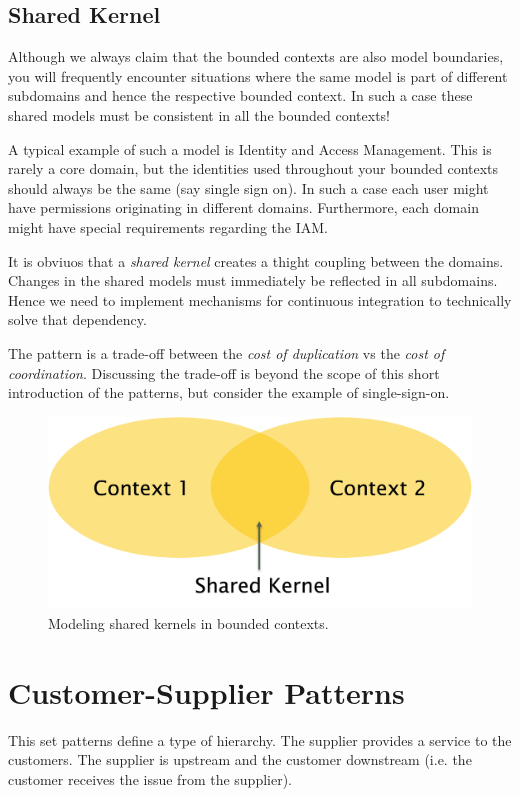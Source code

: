 \documentclass{tufte-handout}
\begin{document}
\subsection{Shared Kernel}

Although we always claim that the bounded contexts are also model boundaries, you will 
frequently encounter situations where the same model is part of different subdomains and
hence the respective bounded context. In such a case these shared models must be consistent
in all the  bounded contexts!

A typical example of such a model is Identity and Access Management. This is rarely a core
domain, but the identities used throughout your bounded contexts should always be the same 
(say single sign on). In such a case each user might have permissions originating in different
domains. Furthermore, each domain might have special requirements regarding the IAM.

It is obviuos that a \textit{shared kernel} creates a thight coupling between the domains.
Changes in the shared models must immediately be reflected in all subdomains. Hence we 
need to implement mechanisms for continuous integration to technically solve that dependency.

The pattern is a trade-off between the \textit{cost of duplication} vs the 
\textit{cost of coordination}. Discussing the trade-off is beyond the scope of this 
short introduction of the patterns, but consider the example of single-sign-on.

\begin{figure}
    \includegraphics[width=.8\textwidth]{img/integrating_context_shared_kernel.png}
    \caption{Modeling shared kernels in bounded contexts.}
\end{figure}

\section{Customer-Supplier Patterns}

This set patterns define a type of hierarchy. The supplier provides a service to the 
customers. The supplier is upstream and the customer downstream (i.e. the customer
receives the issue from the supplier).
\end{document}
